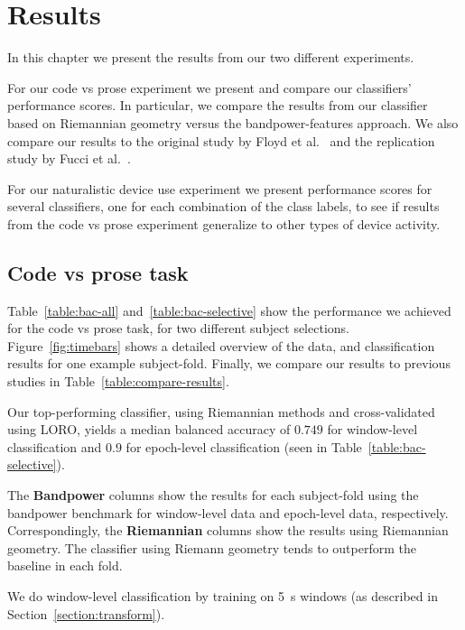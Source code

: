 \chapter{Results}\label{section:results}

    In this chapter we present the results from our two different experiments.

    For our code vs prose experiment we present and compare our classifiers' performance scores. In particular, we compare the results from our classifier based on Riemannian geometry versus the bandpower-features approach. We also compare our results to the original study by Floyd et al.~\cite{floyd_decoding_2017} and the replication study by Fucci et al.~\cite{fucci_replication_2019}. 

    For our naturalistic device use experiment we present performance scores for several classifiers, one for each combination of the class labels, to see if results from the code vs prose experiment generalize to other types of device activity.

    \pagebreak
    \section{Code vs prose task}
        Table~\ref{table:bac-all} and~\ref{table:bac-selective} show the performance we achieved for the code vs prose task, for two different subject selections. Figure~\ref{fig:timebars} shows a detailed overview of the data, and classification results for one example subject-fold. Finally, we compare our results to previous studies in Table~\ref{table:compare-results}.

        

        Our top-performing classifier, using Riemannian methods and cross-validated using LORO, yields a median balanced accuracy of $0.749$  for window-level classification and $0.9$ for epoch-level classification (seen in Table~\ref{table:bac-selective}).

        The \textbf{Bandpower} columns show the results for each subject-fold using the bandpower benchmark for window-level data and epoch-level data, respectively. Correspondingly, the \textbf{Riemannian} columns show the results using Riemannian geometry. The classifier using Riemann geometry tends to outperform the baseline in each fold.

        We do window-level classification by training on \SI{5}{\second} windows (as described in Section~\ref{section:transform}).

